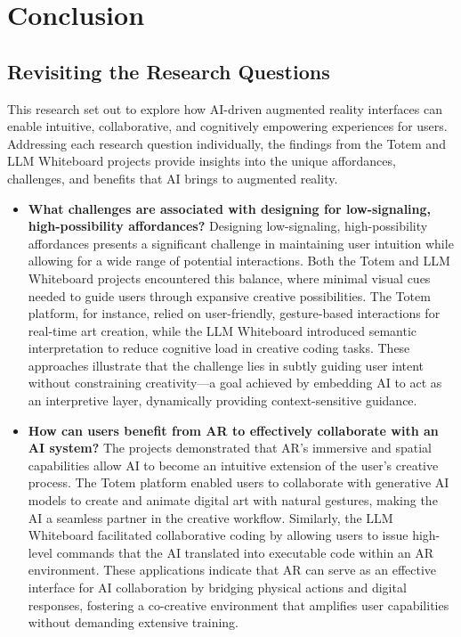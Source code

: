 \section{Conclusion}

\subsection{Revisiting the Research Questions}
This research set out to explore how AI-driven augmented reality interfaces can enable intuitive, collaborative, and cognitively empowering experiences for users.
Addressing each research question individually, the findings from the Totem and LLM Whiteboard projects provide insights into the unique affordances, challenges, and benefits that AI brings to augmented reality.

\begin{itemize}
    \item \textbf{What challenges are associated with designing for low-signaling, high-possibility affordances?} Designing low-signaling, high-possibility affordances presents a significant challenge in maintaining user intuition while allowing for a wide range of potential interactions.
    Both the Totem and LLM Whiteboard projects encountered this balance, where minimal visual cues needed to guide users through expansive creative possibilities.
    The Totem platform, for instance, relied on user-friendly, gesture-based interactions for real-time art creation, while the LLM Whiteboard introduced semantic interpretation to reduce cognitive load in creative coding tasks.
    These approaches illustrate that the challenge lies in subtly guiding user intent without constraining creativity—a goal achieved by embedding AI to act as an interpretive layer, dynamically providing context-sensitive guidance.
    
    \item \textbf{How can users benefit from AR to effectively collaborate with an AI system?} The projects demonstrated that AR’s immersive and spatial capabilities allow AI to become an intuitive extension of the user's creative process.
    The Totem platform enabled users to collaborate with generative AI models to create and animate digital art with natural gestures, making the AI a seamless partner in the creative workflow.
    Similarly, the LLM Whiteboard facilitated collaborative coding by allowing users to issue high-level commands that the AI translated into executable code within an AR environment.
    These applications indicate that AR can serve as an effective interface for AI collaboration by bridging physical actions and digital responses, fostering a co-creative environment that amplifies user capabilities without demanding extensive training.
    

\end{itemize}
